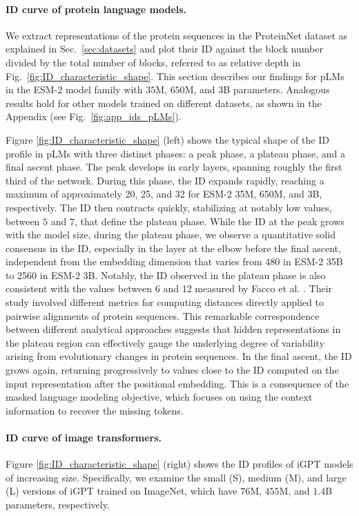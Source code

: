 \documentclass{article}
\begin{document}
\paragraph{ID curve of protein language models.}
\label{subsub:characteristic_shape}
%
%
We extract representations of the protein sequences in the ProteinNet dataset as explained in Sec.~\ref{sec:datasets} and plot their ID against the block number divided by the total number of blocks, referred to as relative depth in Fig.~\ref{fig:ID_characteristic_shape}. 
%
This section describes our findings for pLMs in the ESM-2 model family with $35$M, $650$M, and $3$B parameters.  
%
Analogous results hold for other models trained on different datasets, as shown in the Appendix (see Fig.~\ref{fig:app_ids_pLMs}). 

Figure \ref{fig:ID_characteristic_shape} (left) shows the typical shape of the ID profile in pLMs with three distinct phases: a peak phase, a plateau phase, and a final ascent phase. 
%
The peak develops in early layers, spanning roughly the first third of the network. 
%
During this phase, the ID expands rapidly, reaching a maximum of approximately 20, 25, and 32 for ESM-2 35M, 650M, and 3B, respectively. The ID then contracts quickly, stabilizing at notably low values, between $5$ and $7$, that define the plateau phase.
%
While the ID at the peak grows with the model size, during the plateau phase, we observe a quantitative solid consensus in the ID, especially in the layer at the elbow before the final ascent, independent from the embedding dimension that varies from 480 in ESM-2 35B to 2560 in ESM-2 3B. 
%
%
Notably, the ID observed in the plateau phase is also consistent with the values between 6 and 12 measured by Facco et al. \cite{facco2019protein}. Their study involved different metrics for computing distances directly applied to pairwise alignments of protein sequences.
%
This remarkable correspondence between different analytical approaches suggests that hidden representations in the plateau region can effectively gauge the underlying degree of variability arising from evolutionary changes in protein sequences. 
%
In the final ascent, the ID grows again, returning progressively to values close to the ID computed on the input representation after the positional embedding. 
%
This is a consequence of the masked language modeling objective, which focuses on using the context information to recover the missing tokens.  

\paragraph{ID curve of image transformers.} 
\label{sec:id_igpts}
Figure \ref{fig:ID_characteristic_shape} (right) shows the ID profiles of iGPT models of increasing size. Specifically, we examine the small (S), medium (M), and large (L) versions of iGPT trained on ImageNet, which have $76$M, $455$M, and $1.4$B parameters, respectively.
%
\end{document}
